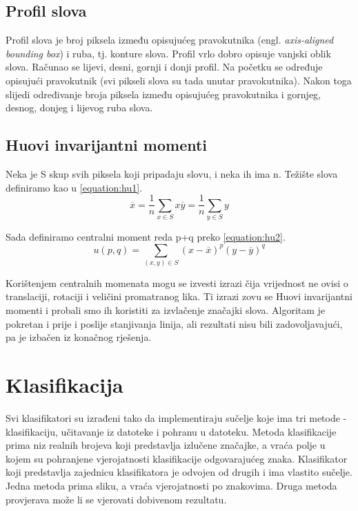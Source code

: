 \documentclass[a4paper,twocolumn,dvipdfm]{article}
\begin{document}
\subsection{Profil slova}
Profil slova je broj piksela između opisujućeg pravokutnika (engl.
\emph{axis-aligned bounding box}) i ruba, tj. konture slova. Profil vrlo dobro
opisuje vanjski oblik slova. Računao se lijevi, desni, gornji i donji profil. Na
početku se određuje opisujući pravokutnik (svi pikseli slova su tada unutar
pravokutnika). Nakon toga slijedi određivanje broja piksela između opisujućeg
pravokutnika i gornjeg, desnog, donjeg i lijevog ruba slova.

\subsection{Huovi invarijantni momenti}
Neka je S skup svih piksela koji pripadaju slovu, i neka ih ima n.
Težište slova definiramo kao u \ref{equation:hu1}.
\begin{equation}
\overline{x} = \frac{1}{n}\displaystyle\sum_{x \in S}x
\overline{y} = \frac{1}{n}\displaystyle\sum_{y \in S}y
\label{equation:hu1}
\end{equation}

Sada definiramo centralni moment reda p+q preko \ref{equation:hu2}.
\begin{equation}
u(p,q) = \displaystyle\sum_{(x,y) \in S}(x-\overline{x})^p(y-\overline{y})^q
\label{equation:hu2}
\end{equation}

Korištenjem centralnih momenata mogu se izvesti izrazi čija vrijednost ne ovisi
o translaciji, rotaciji i veličini promatranog lika. Ti izrazi zovu se Huovi
invarijantni momenti i probali smo ih koristiti za izvlačenje značajki slova.
Algoritam je pokretan i prije i poslije stanjivanja linija, ali rezultati nisu
bili zadovoljavajući, pa je izbačen iz konačnog rješenja.


\section{Klasifikacija}
Svi klasifikatori su izrađeni tako da implementiraju sučelje koje ima tri metode
- klasifikaciju, učitavanje iz datoteke i pohranu u datoteku. Metoda
klasifikacije prima niz realnih brojeva koji predstavlja izlučene značajke, a
vraća polje u kojem su pohranjene vjerojatnosti klasifikacije odgovarajućeg
znaka. Klasifikator koji predstavlja zajednicu klasifikatora je odvojen od
drugih i ima vlastito sučelje. Jedna metoda prima sliku, a vraća vjerojatnosti
po znakovima. Druga metoda provjerava može li se vjerovati dobivenom rezultatu.
\end{document}
